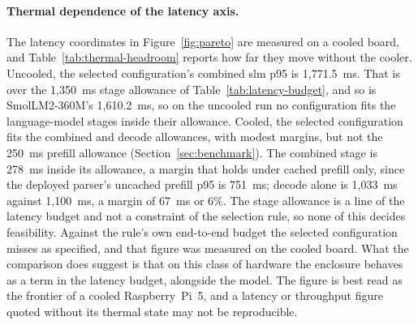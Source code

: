 \paragraph{Thermal dependence of the latency axis.} The latency coordinates in
Figure~\ref{fig:pareto} are measured on a cooled board, and Table~\ref{tab:thermal-headroom} reports
how far they move without the cooler. Uncooled, the selected configuration's combined \gls{slm} p95
is 1{,}771.5~ms. That is over the 1{,}350~ms stage allowance of Table~\ref{tab:latency-budget}, and
so is SmolLM2-360M's 1{,}610.2~ms, so on the uncooled run no configuration fits the language-model
stages inside their allowance. Cooled, the selected configuration fits the combined and decode
allowances, with modest margins, but not the 250~ms prefill allowance (Section~\ref{sec:benchmark}).
The combined stage is 278~ms inside its allowance, a margin that holds under cached prefill only,
since the deployed parser's uncached prefill p95 is 751~ms; decode alone is 1{,}033~ms against
1{,}100~ms, a margin of 67~ms or 6\%. The stage allowance is a line of the latency budget and not a
constraint of the selection rule, so none of this decides feasibility. Against the rule's own
end-to-end budget the selected configuration misses as specified, and that figure was measured on
the cooled board. What the comparison does suggest is that on this class of hardware the enclosure
behaves as a term in the latency budget, alongside the model. The figure is best read as the
frontier of a cooled Raspberry~Pi~5, and a latency or throughput figure quoted without its thermal
state may not be reproducible.

